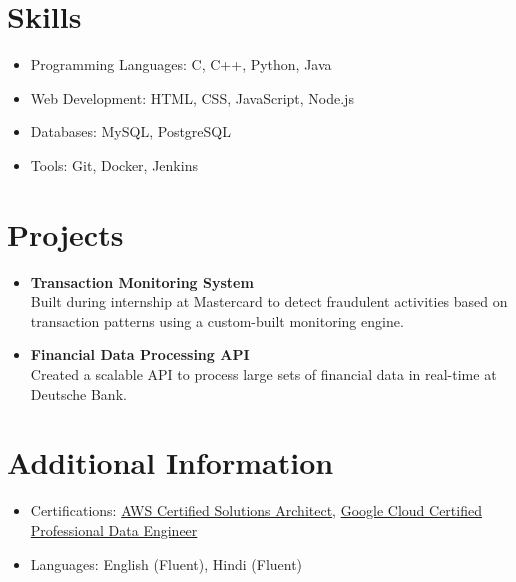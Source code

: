 \documentclass[a4paper,10pt]{article} %
\begin{document}
\vspace{0.7em} %

\section*{Skills}
\begin{itemize}[leftmargin=0.3in, itemsep=3pt, topsep=2pt]
    \item Programming Languages: C, C++, Python, Java
    \item Web Development: HTML, CSS, JavaScript, Node.js
    \item Databases: MySQL, PostgreSQL
    \item Tools: Git, Docker, Jenkins
\end{itemize}

\vspace{0.7em} %

\section*{Projects}
\begin{itemize}[leftmargin=0.3in, itemsep=3pt, topsep=2pt]
    \item \textbf{Transaction Monitoring System} \\
    Built during internship at Mastercard to detect fraudulent activities based on transaction patterns using a custom-built monitoring engine.

    \item \textbf{Financial Data Processing API} \\
    Created a scalable API to process large sets of financial data in real-time at Deutsche Bank.
\end{itemize}

\vspace{0.7em} %

\section*{Additional Information}
\begin{itemize}[leftmargin=0.3in, itemsep=3pt, topsep=2pt]
    \item Certifications: \href{https://aws.amazon.com/certification/certified-solutions-architect-associate/}{AWS Certified Solutions Architect}, \href{https://cloud.google.com/certification/data-engineer}{Google Cloud Certified Professional Data Engineer}
    \item Languages: English (Fluent), Hindi (Fluent)
\end{itemize}
\end{document}
